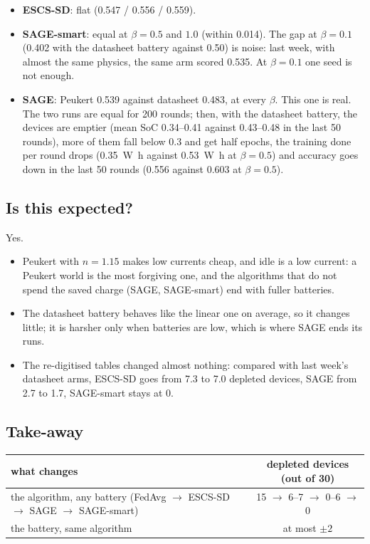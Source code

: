 \documentclass[11pt,a4paper]{article}
\begin{document}
\begin{itemize}
  \item \textbf{ESCS-SD}: flat (0.547 / 0.556 / 0.559).
  \item \textbf{SAGE-smart}: equal at $\beta=0.5$ and $1.0$ (within 0.014).
        The gap at $\beta=0.1$ (0.402 with the datasheet battery against 0.50)
        is noise: last week, with almost the same physics, the same arm scored
        0.535. At $\beta=0.1$ one seed is not enough.
  \item \textbf{SAGE}: Peukert 0.539 against datasheet 0.483, at every $\beta$.
        This one is real. The two runs are equal for 200 rounds; then, with the
        datasheet battery, the devices are emptier (mean SoC 0.34--0.41 against
        0.43--0.48 in the last 50 rounds), more of them fall below 0.3 and get
        half epochs, the training done per round drops (\SI{0.35}{\watt\hour}
        against \SI{0.53}{\watt\hour} at $\beta=0.5$) and accuracy goes down in
        the last 50 rounds (0.556 against 0.603 at $\beta=0.5$).
\end{itemize}

\subsection{Is this expected?}

Yes.
\begin{itemize}
  \item Peukert with $n=1.15$ makes low currents cheap, and idle is a low
        current: a Peukert world is the most forgiving one, and the algorithms
        that do not spend the saved charge (SAGE, SAGE-smart) end with fuller
        batteries.
  \item The datasheet battery behaves like the linear one on average, so it
        changes little; it is harsher only when batteries are low, which is
        where SAGE ends its runs.
  \item The re-digitised tables changed almost nothing: compared with last
        week's datasheet arms, ESCS-SD goes from 7.3 to 7.0 depleted devices,
        SAGE from 2.7 to 1.7, SAGE-smart stays at 0.
\end{itemize}

\subsection{Take-away}

\begin{center}
\begin{tabular}{lc}
\toprule
what changes & depleted devices (out of 30) \\
\midrule
the algorithm, any battery (FedAvg $\rightarrow$ ESCS-SD $\rightarrow$ SAGE $\rightarrow$ SAGE-smart) & 15 $\rightarrow$ 6--7 $\rightarrow$ 0--6 $\rightarrow$ 0 \\
the battery, same algorithm & at most $\pm 2$ \\
\bottomrule
\end{tabular}
\end{center}
\end{document}
